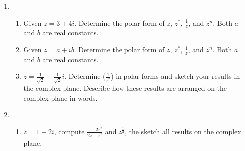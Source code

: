\documentclass[12pt]{article}
\begin{document}
\begin{enumerate}
\begin{enumerate}
\begin{center}
\end{center}
		
		\end{enumerate}


	\item 
		\begin{enumerate}

		    	\item Given $z=3+4i$. Determine the polar form of $z$, $z^{*}$, $\frac{1}{z}$, and $z^{n}$.  Both $a$ and $b$ are real constants. 

			\item Given $z=a+ib$. Determine the polar form of $z$, $z^{*}$, $\frac{1}{z}$, and $z^{n}$.  Both $a$ and $b$ are real constants. 	

		\item $z = \frac{1}{\sqrt{2}} + \frac{1}{{\sqrt{2}}}i$. Determine ($\frac{1}{z^{*}}$) in polar forms and sketch your results in the complex plane. Describe how these results are arranged on the complex plane in words.
		\end{enumerate}
		
	\item 
		\begin{enumerate}

		    \item $z=1+2i$, compute $\frac{z-2z^{*}}{2z+z^{*}}$ and $z^{\frac{1}{3}}$, the sketch all results on the complex plane.


\end{enumerate}
\end{enumerate}
\end{document}
